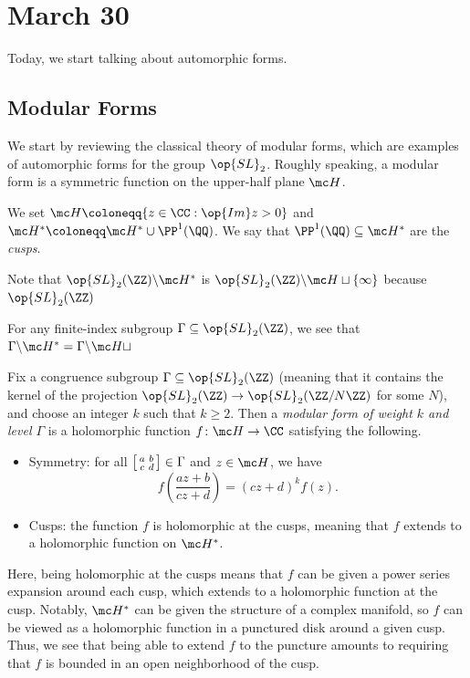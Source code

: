\documentclass[../notes.tex]{subfiles}
\begin{document}
\section{March 30}
Today, we start talking about automorphic forms.

\subsection{Modular Forms}
We start by reviewing the classical theory of modular forms, which are examples of automorphic forms for the group $\op{SL}_2$. Roughly speaking, a modular form is a symmetric function on the upper-half plane $\mc H$.
\begin{definition}[cusp]
	We set $\mc H\coloneqq\{z\in\CC:\op{Im}z>0\}$ and $\mc H^*\coloneqq\mc H^*\cup\PP^1(\QQ)$. We say that $\PP^1(\QQ)\subseteq\mc H^*$ are the \textit{cusps}.
\end{definition}
\begin{example}
	Note that $\op{SL}_2(\ZZ)\backslash\mc H^*$ is $\op{SL}_2(\ZZ)\backslash\mc H\sqcup\{\infty\}$ because $\op{SL}_2(\ZZ)$
\end{example}
\begin{example}
	For any finite-index subgroup $\Gamma\subseteq\op{SL}_2(\ZZ)$, we see that $\Gamma\backslash\mc H^*=\Gamma\backslash\mc H\sqcup$
\end{example}
\begin{definition}
	Fix a congruence subgroup $\Gamma\subseteq\op{SL}_2(\ZZ)$ (meaning that it contains the kernel of the projection $\op{SL}_2(\ZZ)\to\op{SL}_2(\ZZ/N\ZZ)$ for some $N$), and choose an integer $k$ such that $k\ge2$. Then a \textit{modular form of weight $k$ and level $\Gamma$} is a holomorphic function $f\colon\mc H\to\CC$ satisfying the following.
	\begin{itemize}
		\item Symmetry: for all $\begin{bsmallmatrix}
			a & b \\ c & d
		\end{bsmallmatrix}\in\Gamma$ and $z\in\mc H$, we have
		\[f\left(\frac{az+b}{cz+d}\right)=(cz+d)^kf(z).\]
		\item Cusps: the function $f$ is holomorphic at the cusps, meaning that $f$ extends to a holomorphic function on $\mc H^*$.
	\end{itemize}
\end{definition}
Here, being holomorphic at the cusps means that $f$ can be given a power series expansion around each cusp, which extends to a holomorphic function at the cusp. Notably, $\mc H^*$ can be given the structure of a complex manifold, so $f$ can be viewed as a holomorphic function in a punctured disk around a given cusp. Thus, we see that being able to extend $f$ to the puncture amounts to requiring that $f$ is bounded in an open neighborhood of the cusp.
\end{document}

